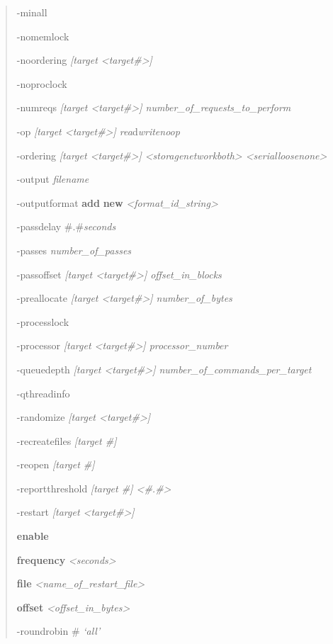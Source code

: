 \begin{quote}
-minall

-nomemlock

-noordering \emph{{[}target \textless target\#\textgreater{]}}

-noproclock

-numreqs \emph{{[}target \textless target\#\textgreater{]} number\_of\_requests\_to\_perform}

-op \emph{{[}target \textless target\#\textgreater{]} rea}d\textbar{}\emph{write\textbar noop}

-ordering \emph{{[}target \textless target\#\textgreater{]} \textless storage\textbar network\textbar both\textgreater{} \textless serial\textbar loose\textbar none\textgreater{}}

-output \emph{filename}

-outputformat \textbf{add} \emph{\textbar{}} \textbf{new} \emph{\textless format\_id\_string\textgreater{}}

-passdelay \#.\#\emph{seconds}

-passes \emph{number\_of\_passes}

-passoffset \emph{{[}target \textless target\#\textgreater{]} offset\_in\_blocks}

-preallocate \emph{{[}target \textless target\#\textgreater{]} number\_of\_bytes}

-processlock

-processor \emph{{[}target \textless target\#\textgreater{]} processor\_number}

-queuedepth \emph{{[}target \textless target\#\textgreater{]} number\_of\_commands\_per\_target}

-qthreadinfo

-randomize \emph{{[}target \textless target\#\textgreater{]}}

-recreatefiles \emph{{[}target \#{]}}

-reopen \emph{{[}target \#{]}}

-reportthreshold \emph{{[}target \#{]} \textless\#.\#\textgreater{}}

-restart \emph{{[}target \textless target\#\textgreater{]}}

\textbf{enable}

\textbf{frequency} \emph{\textless seconds\textgreater{}}

\textbf{file} \emph{\textless name\_of\_restart\_file\textgreater{}}

\textbf{offset} \emph{\textless offset\_in\_bytes\textgreater{}}

-roundrobin \# \emph{\textbar{} `all'}


\end{quote}
